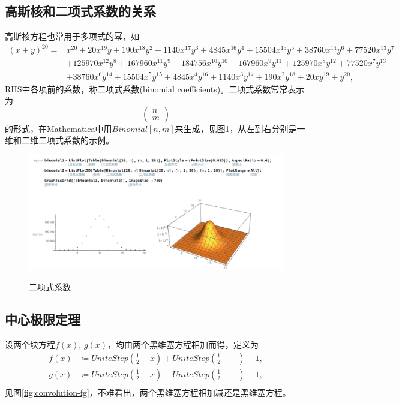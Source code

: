 \begin{subappendices}
\subsection{高斯核和二项式系数的关系}
\label{sec:kernel-gaussian-binomial}
高斯核方程也常用于多项式的幂，如
\begin{equation*}
  \begin{split}
    (x+y)^{20}
    =& x^{20}+20 x^{19} y+190 x^{18} y^2+1140 x^{17} y^3+4845 x^{16} y^4+15504 x^{15} y^5+38760 x^{14} y^6+77520 x^{13} y^7\\
    &+125970 x^{12} y^8+167960 x^{11} y^9+184756 x^{10}
   y^{10}+167960 x^9 y^{11}+125970 x^8 y^{12}+77520 x^7 y^{13}\\
   &+38760 x^6 y^{14}+15504 x^5 y^{15}+4845 x^4 y^{16}+1140 x^3 y^{17}+190 x^2 y^{18}+20 x y^{19}+y^{20},
  \end{split}
\end{equation*}
RHS中各项前的系数，称二项式系数(binomial coefficients)。二项式系数常常表示为
\begin{equation*}
  \begin{pmatrix}
    n \\ m
  \end{pmatrix}
\end{equation*}
的形式，在Mathematica中用$Binomial[n,m]$来生成，见图\ref{fig:binomial-coefficients}，从左到右分别是一维和二维二项式系数的示例。

\begin{figure}[htbp]
  \caption{二项式系数}
  \centering
  \includegraphics[width=12cm]{./Figures/20180405-binomial-coefficients}
  \label{fig:binomial-coefficients}
%
\end{figure}


\subsection{中心极限定理}
\label{sec:kernel-gaussian-central-limit-theorem}
设两个块方程$f(x), \, g(x)$，均由两个黑维塞方程相加而得，定义为
\begin{equation*}
  \begin{split}
    f(x) & \coloneqq UniteStep \left( \frac{1}{2} + x \right) + UniteStep \left( \frac{1}{2} + - \right) -1, \\
     g(x) & \coloneqq UniteStep \left( \frac{1}{2} + x \right) - UniteStep \left( \frac{1}{2} + - \right) -1, \\
  \end{split}
\end{equation*}
见图\eqref{fig:convolution-fg}，不难看出，两个黑维塞方程相加减还是黑维塞方程。


\end{subappendices}
